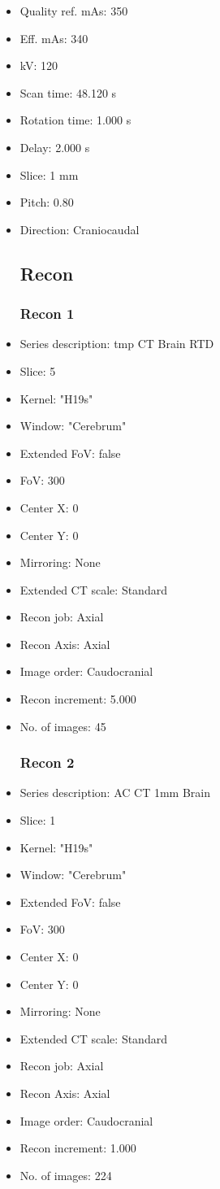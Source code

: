 \documentclass[12pt]{article}
\begin{document}
\begin{itemize}
\subsection{Scan}
\item Quality ref. mAs: 350\item Eff. mAs: 340\item kV: 120\item Scan time: 48.120 s\item Rotation time: 1.000 s\item Delay: 2.000 s\item Slice: 1 mm\item Pitch: 0.80\item Direction: Craniocaudal
\subsection{Recon}

\subsubsection{Recon 1}
\item Series description: tmp CT Brain RTD
\item Slice: 5
\item Kernel: "H19s"
\item Window: "Cerebrum"
\item Extended FoV: false
\item FoV: 300
\item Center X: 0
\item Center Y: 0
\item Mirroring: None
\item Extended CT scale: Standard
\item Recon job: Axial
\item Recon Axis: Axial
\item Image order: Caudocranial
\item Recon increment: 5.000
\item No. of images: 45
\subsubsection{Recon 2}
\item Series description: AC CT 1mm Brain
\item Slice: 1
\item Kernel: "H19s"
\item Window: "Cerebrum"
\item Extended FoV: false
\item FoV: 300
\item Center X: 0
\item Center Y: 0
\item Mirroring: None
\item Extended CT scale: Standard
\item Recon job: Axial
\item Recon Axis: Axial
\item Image order: Caudocranial
\item Recon increment: 1.000
\item No. of images: 224

\end{itemize}
\end{document}
